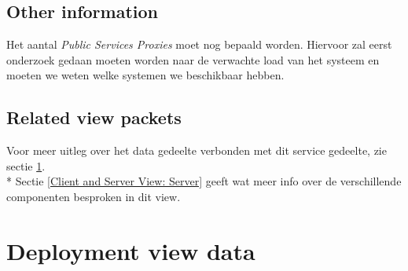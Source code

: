 \documentclass[a4paper,10pt]{article}
\begin{document}
\subsection{Other information}

Het aantal \textit{Public Services Proxies} moet nog bepaald worden. Hiervoor zal eerst onderzoek gedaan moeten worden naar de verwachte load van het systeem en moeten we weten welke systemen we beschikbaar hebben.

\subsection{Related view packets}
Voor meer uitleg over het data gedeelte verbonden met dit service gedeelte, zie sectie \ref{sec:deployment_data}.\\*
Sectie \ref{Client and Server View: Server} geeft wat meer info over de verschillende componenten besproken in dit view.

\clearpage
\section{Deployment view data}
\label{sec:deployment_data}
\end{document}
